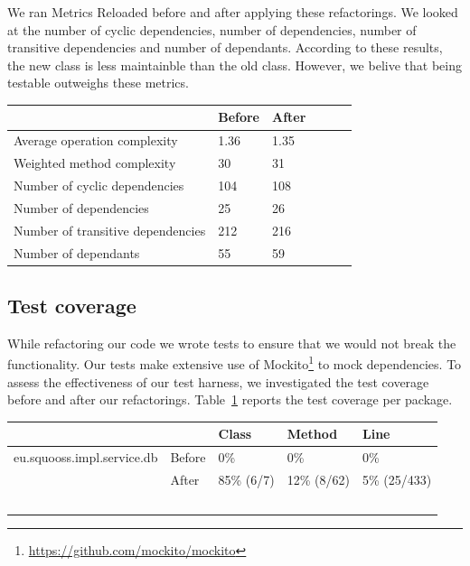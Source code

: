 \documentclass{article}
\begin{document}
We ran Metrics Reloaded before and after applying these refactorings. We looked at the number of cyclic dependencies, number of dependencies, number of transitive dependencies and number of dependants. According to these results, the new class is less maintainble than the old class. However, we belive that being testable outweighs these metrics.

\begin{table}
    \begin{tabular}{l|llll}
    ~                                 & Before & After & ~ & ~ \\ \hline
    Average operation complexity      & 1.36   & 1.35 \\
    Weighted method complexity        & 30     & 31 \\
    Number of cyclic dependencies     & 104 & 108 \\
    Number of dependencies            & 25  & 26  \\
    Number of transitive dependencies & 212 & 216 \\
    Number of dependants              & 55  & 59  \\
    \end{tabular}
\end{table}


\subsection{Test coverage}
While refactoring our code we wrote tests to ensure that we would not break the functionality. Our tests make extensive use of Mockito\footnote{\url{https://github.com/mockito/mockito}} to mock dependencies. To assess the effectiveness of our test harness, we investigated the test coverage before and after our refactorings. Table~\ref{tbl:coverage} reports the test coverage per package.

\begin{table}
    \begin{tabular}{ll|lll}
    ~                          & ~      & Class      & Method      & Line         \\ \hline
    eu.squooss.impl.service.db & Before & 0\%        & 0\%         & 0\%          \\
    ~                          & After  & 85\% (6/7) & 12\% (8/62) & 5\% (25/433) \\ \hline
    ~                          & ~      & ~          & ~           & ~            \\
    \end{tabular}
    \label{tbl:coverage}
\end{table}



\end{document}
